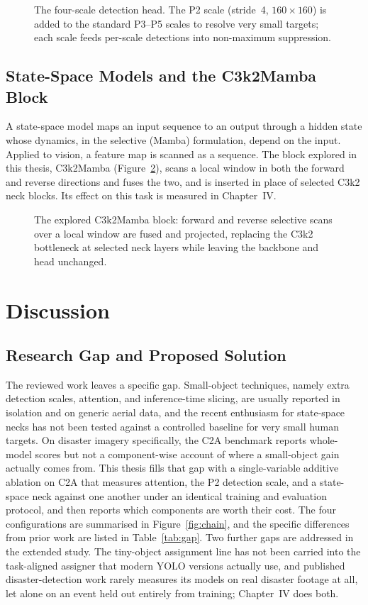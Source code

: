 \begin{figure}[tbp]
  \centering
  \caption{The four-scale detection head. The P2 scale (stride~4, $160\times160$)
  is added to the standard P3--P5 scales to resolve very small targets; each scale
  feeds per-scale detections into non-maximum suppression.}
  \label{fig:p2}
\end{figure}

\subsection{State-Space Models and the C3k2Mamba Block}
A state-space model maps an input sequence to an output through a hidden state
whose dynamics, in the selective (Mamba) formulation, depend on the input. Applied
to vision, a feature map is scanned as a sequence. The block explored in this
thesis, C3k2Mamba (Figure~\ref{fig:mamba}), scans a local window in both the forward
and reverse directions and fuses the two, and is inserted in place of selected C3k2
neck blocks. Its effect on this task is measured in Chapter~IV.

\begin{figure}[tbp]
  \centering
  \caption{The explored C3k2Mamba block: forward and reverse selective scans over a
  local window are fused and projected, replacing the C3k2 bottleneck at selected
  neck layers while leaving the backbone and head unchanged.}
  \label{fig:mamba}
\end{figure}

\section{Discussion}

\subsection{Research Gap and Proposed Solution}
The reviewed work leaves a specific gap. Small-object techniques, namely extra
detection scales, attention, and inference-time slicing, are usually reported in
isolation and on generic aerial data, and the recent enthusiasm for state-space
necks has not been tested against a controlled baseline for very small human
targets. On disaster imagery specifically, the C2A benchmark reports whole-model
scores but not a component-wise account of where a small-object gain actually comes
from. This thesis fills that gap with a single-variable additive ablation on C2A
that measures attention, the P2 detection scale, and a state-space neck against one
another under an identical training and evaluation protocol, and then reports which
components are worth their cost. The four configurations are summarised in
Figure~\ref{fig:chain}, and the specific differences from prior work are listed in
Table~\ref{tab:gap}. Two further gaps are addressed in the extended study. The
tiny-object assignment line has not been carried into the task-aligned assigner
that modern YOLO versions actually use, and published disaster-detection work
rarely measures its models on real disaster footage at all, let alone on an
event held out entirely from training; Chapter~IV does both.

